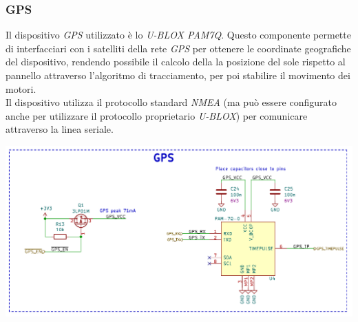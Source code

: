 \hypertarget{gps}{%
\subsubsection{\texorpdfstring{GPS}{GPS}}\label{gps}}

Il dispositivo \emph{GPS} utilizzato è lo \emph{U-BLOX PAM7Q}. Questo
componente permette di interfacciari con i satelliti della rete \emph{GPS}
per ottenere le coordinate geografiche del dispositivo, rendendo possibile 
il calcolo della la posizione del sole rispetto al
pannello attraverso l'algoritmo di tracciamento, per poi
stabilire il movimento dei motori.\\
Il dispositivo utilizza il protocollo standard \emph{NMEA} (ma può
essere configurato anche per utilizzare il protocollo proprietario
\emph{U-BLOX}) per comunicare attraverso la linea seriale.

\begin{center}
\includegraphics[scale=0.5]{figures/image26.png}
\captionsetup{type=figure}
\end{center}

